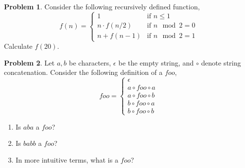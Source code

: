 \documentclass{article}
\numberwithin{pic}{section}
\numberwithin{lem}{section}
\numberwithin{thm}{section}
\numberwithin{cor}{section}
\theoremstyle{definition}
\numberwithin{ex}{section}
\numberwithin{defn}{section}
\theoremstyle{definition}
\newtheorem{prob}{Problem}
\theoremstyle{remark}
\begin{document}
\begin{prob}
  Consider the following recursively defined function,
  $$f(n) =
  \begin{cases}
    1 &\text{if }n \leq 1\\
    n\cdot f(n / 2) &\text{if }n\mod 2 = 0\\
    n + f(n - 1) &\text{if }n\mod 2 = 1
  \end{cases} $$
  Calculate $f(20)$.
\end{prob}

\begin{prob}
  Let $a,b$ be characters, $\epsilon$ be the empty string, and $\circ$ denote string concatenation. Consider the following definition of a $foo$,
  $$foo =
  \begin{cases}
    \epsilon\\
    a\circ foo \circ a\\
    a\circ foo \circ b\\
    b\circ foo \circ a\\
    b\circ foo \circ b
  \end{cases}
  $$
  \begin{enumerate}
  \item Is $aba$ a $foo$?
  \item Is $babb$ a $foo$?
  \item In more intuitive terms, what is a $foo$?
  \end{enumerate}
\end{prob}
\end{document}
